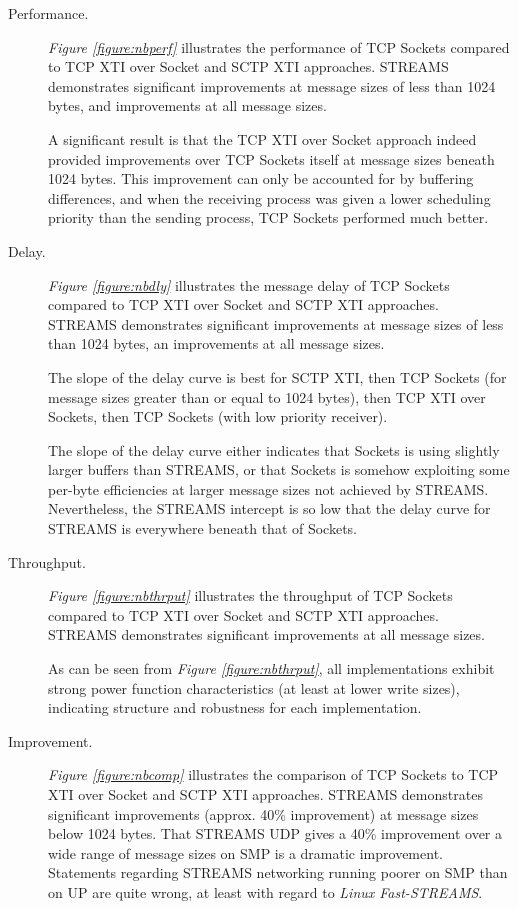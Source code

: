\documentclass[letterpaper,final,notitlepage,twocolumn,10pt,twoside]{article}
\begin{document}
\begin{description}

\item[Performance.]

\textit{Figure \ref{figure:nbperf}} illustrates the performance of TCP Sockets compared to TCP XTI
over Socket and SCTP XTI approaches.  STREAMS demonstrates significant improvements at message sizes
of less than 1024 bytes, and improvements at all message sizes.

A significant result is that the TCP XTI over Socket approach indeed provided improvements over TCP
Sockets itself at message sizes beneath 1024 bytes.  This improvement can only be accounted for by
buffering differences, and when the receiving process was given a lower scheduling priority than the
sending process, TCP Sockets performed much better.

\item[Delay.]

\textit{Figure \ref{figure:nbdly}} illustrates the message delay of TCP Sockets compared to TCP XTI
over Socket and SCTP XTI approaches.  STREAMS demonstrates significant improvements at message sizes
of less than 1024 bytes, an improvements at all message sizes.

The slope of the delay curve is best for SCTP XTI, then TCP Sockets (for message sizes greater than
or equal to 1024 bytes), then TCP XTI over Sockets, then TCP Sockets (with low priority receiver).

The slope of the delay curve either indicates that Sockets is using slightly larger buffers than
STREAMS, or that Sockets is somehow exploiting some per-byte efficiencies at larger message sizes
not achieved by STREAMS.  Nevertheless, the STREAMS intercept is so low that the delay curve for
STREAMS is everywhere beneath that of Sockets.

\item[Throughput.]

\textit{Figure \ref{figure:nbthrput}} illustrates the throughput of TCP Sockets compared to TCP XTI
over Socket and SCTP XTI approaches.  STREAMS demonstrates significant improvements at all message
sizes.

As can be seen from \textit{Figure \ref{figure:nbthrput}}, all implementations exhibit strong power
function characteristics (at least at lower write sizes), indicating structure and robustness for
each implementation.

\item[Improvement.]

\textit{Figure \ref{figure:nbcomp}} illustrates the comparison of TCP Sockets to TCP XTI over
Socket and SCTP XTI approaches.  STREAMS demonstrates significant improvements (approx. 40\%
improvement) at message sizes below 1024 bytes.  That STREAMS UDP gives a 40\% improvement over a
wide range of message sizes on SMP is a dramatic improvement.  Statements regarding STREAMS
networking running poorer on SMP than on UP are quite wrong, at least with regard to \textsl{Linux
Fast-STREAMS}.

\end{description}
\end{document}
